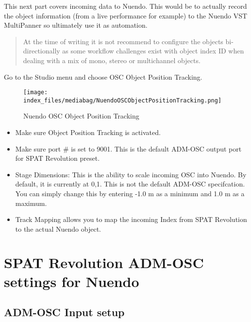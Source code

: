 \documentclass[
  letterpaper,
  DIV=11,
  numbers=noendperiod]{scrreport}
\providecommand{\tightlist}{%
  \setlength{\itemsep}{0pt}\setlength{\parskip}{0pt}}\usepackage{longtable,booktabs,array}
\begin{document}
This next part covers incoming data to Nuendo. This would be to actually
record the object information (from a live performance for example) to
the Nuendo VST MultiPanner so ultimately use it as automation.

\begin{quote}
At the time of writing it is not recommend to configure the objects
bi-directionally as some workflow challenges exist with object index ID
when dealing with a mix of mono, stereo or multichannel objects.
\end{quote}

Go to the Studio menu and choose OSC Object Position Tracking.

\begin{figure}

{\centering \texttt{[image: index\_files/mediabag/NuendoOSCObjectPositionTracking.png]}

}

\caption{Nuendo OSC Object Position Tracking}

\end{figure}

\begin{itemize}
\tightlist
\item
  Make sure Object Position Tracking is activated.
\item
  Make sure port \# is set to 9001. This is the default ADM-OSC output
  port for SPAT Revolution preset.
\item
  Stage Dimensions: This is the ability to scale incoming OSC into
  Nuendo. By default, it is currently at 0,1. This is not the default
  ADM-OSC specifcation. You can simply change this by entering -1.0 m as
  a minimum and 1.0 m as a maximum.
\item
  Track Mapping allows you to map the incoming Index from SPAT
  Revolution to the actual Nuendo object.
\end{itemize}

\hypertarget{spat-revolution-adm-osc-settings-for-nuendo}{%
\section{SPAT Revolution ADM-OSC settings for
Nuendo}\label{spat-revolution-adm-osc-settings-for-nuendo}}

\hypertarget{adm-osc-input-setup}{%
\subsection{ADM-OSC Input setup}\label{adm-osc-input-setup}}
\end{document}
